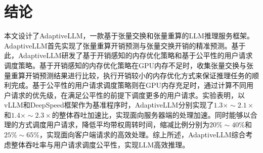 \section{结论}

本文设计了AdaptiveLLM，一款基于张量交换和张量重算的LLM推理服务框架。AdaptiveLLM首先实现了张量重算开销预测与张量交换开销的精准预测。基于此，AdaptiveLLM研发了基于开销感知的内存优化策略和基于公平性的用户请求调度策略。基于开销感知的内存优化策略在GPU内存不足时，收集张量交换与张量重算开销预测结果进行比较，执行开销较小的内存优化方式来保证推理任务的顺利完成。基于公平性的用户请求调度策略则在GPU内存充足时，通过计算不同用户请求的优先级，在满足公平性的前提下调度更多的用户请求。实验表明，以vLLM和DeepSpeed框架作为基准程序时，AdaptiveLLM分别实现了$1.3\times\sim2.1\times$和$1.4\times\sim2.3\times$的整体吞吐加速比，实现面向服务器端的处理加速。同时能够以合理的方式调度用户请求，降低平均带权周转时间，缩减比例分别为$20\%\sim40\%$和$25\%\sim65\%$，实现面向客户端请求的高效处理。综上所述，AdaptiveLLM综合考虑整体吞吐率与用户请求调度公平性，实现LLM高效推理。